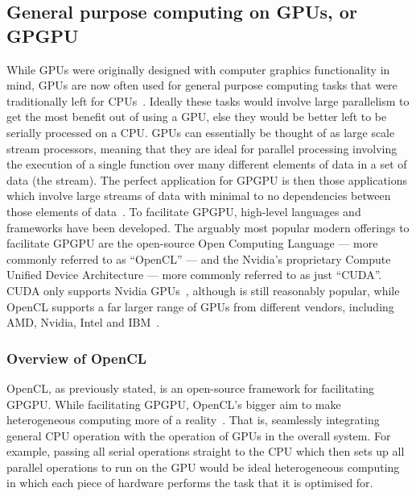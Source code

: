 \documentclass[a4paper,11pt]{article}
\begin{document}

\subsection{General purpose computing on GPUs, or GPGPU} %
\label{sub:general_purpose_computing_on_gpus_or_gpgpu}
While GPUs were originally designed with computer graphics functionality in mind, GPUs are now often used for general
purpose computing tasks that were traditionally left for CPUs~\cite{web:WikiGPGPU}. Ideally these tasks would involve
large parallelism to get the most benefit out of using a GPU, else they would be better left to be serially processed
on a CPU. GPUs can essentially be thought of as large scale stream processors, meaning that they are ideal for parallel
processing involving the execution of a single function over many different elements of data in a set of data (the stream).
The perfect application for GPGPU is then those applications which involve large streams of data with minimal to no
dependencies between those elements of data~\cite{Buck:2004:BGS:1015706.1015800}. To facilitate GPGPU, high-level languages
and frameworks have been developed. The arguably most popular modern offerings to facilitate GPGPU are the open-source
Open Computing Language --- more commonly referred to as ``OpenCL'' --- and the Nvidia's proprietary Compute Unified
Device Architecture --- more commonly referred to as just ``CUDA''. CUDA only supports Nvidia GPUs~\cite{web:NvidiaCUDACompat},
although is still reasonably popular, while OpenCL supports a far larger range of GPUs from different vendors, including
AMD, Nvidia, Intel and IBM~\cite{web:KhronosOpenCLCompat}.


\subsubsection{Overview of OpenCL} %
\label{ssub:overview_of_opencl}
OpenCL, as previously stated, is an open-source framework for facilitating GPGPU. While facilitating GPGPU, OpenCL's bigger
aim to make heterogeneous computing more of a reality~\cite{slides:KhronosOpenCLOverview}. That is, seamlessly integrating general CPU operation with the operation
of GPUs in the overall system. For example, passing all serial operations straight to the CPU which then sets up all parallel
operations to run on the GPU would be ideal heterogeneous computing in which each piece of hardware performs the task
that it is optimised for.
\end{document}
